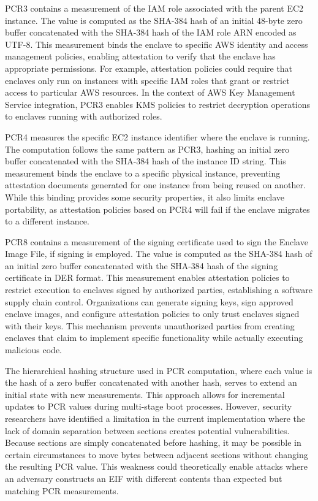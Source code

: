 PCR3 contains a measurement of the IAM role associated with the parent EC2 instance. The value is computed as the SHA-384 hash of an initial 48-byte zero buffer concatenated with the SHA-384 hash of the IAM role ARN encoded as UTF-8. This measurement binds the enclave to specific AWS identity and access management policies, enabling attestation to verify that the enclave has appropriate permissions. For example, attestation policies could require that enclaves only run on instances with specific IAM roles that grant or restrict access to particular AWS resources. In the context of AWS Key Management Service integration, PCR3 enables KMS policies to restrict decryption operations to enclaves running with authorized roles.

PCR4 measures the specific EC2 instance identifier where the enclave is running. The computation follows the same pattern as PCR3, hashing an initial zero buffer concatenated with the SHA-384 hash of the instance ID string. This measurement binds the enclave to a specific physical instance, preventing attestation documents generated for one instance from being reused on another. While this binding provides some security properties, it also limits enclave portability, as attestation policies based on PCR4 will fail if the enclave migrates to a different instance.

PCR8 contains a measurement of the signing certificate used to sign the Enclave Image File, if signing is employed. The value is computed as the SHA-384 hash of an initial zero buffer concatenated with the SHA-384 hash of the signing certificate in DER format. This measurement enables attestation policies to restrict execution to enclaves signed by authorized parties, establishing a software supply chain control. Organizations can generate signing keys, sign approved enclave images, and configure attestation policies to only trust enclaves signed with their keys. This mechanism prevents unauthorized parties from creating enclaves that claim to implement specific functionality while actually executing malicious code.

The hierarchical hashing structure used in PCR computation, where each value is the hash of a zero buffer concatenated with another hash, serves to extend an initial state with new measurements. This approach allows for incremental updates to PCR values during multi-stage boot processes. However, security researchers have identified a limitation in the current implementation where the lack of domain separation between sections creates potential vulnerabilities. Because sections are simply concatenated before hashing, it may be possible in certain circumstances to move bytes between adjacent sections without changing the resulting PCR value. This weakness could theoretically enable attacks where an adversary constructs an EIF with different contents than expected but matching PCR measurements.

